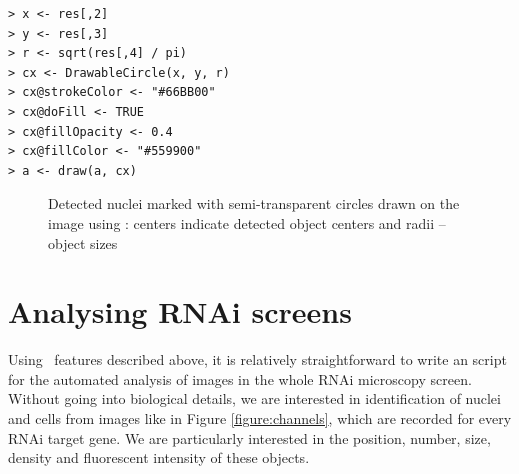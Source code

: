 \begin{verbatim}
> x <- res[,2]
> y <- res[,3]
> r <- sqrt(res[,4] / pi)
> cx <- DrawableCircle(x, y, r)
> cx@strokeColor <- "#66BB00"
> cx@doFill <- TRUE
> cx@fillOpacity <- 0.4
> cx@fillColor <- "#559900"
> a <- draw(a, cx)
\end{verbatim}

\begin{figure}
\vspace*{.1in}
\begin{center}
\end{center}
\caption{\label{figure:drawables}
    Detected nuclei marked with semi-transparent circles drawn on the image using : centers indicate detected object centers and radii -- object sizes
}
\end{figure}

\section*{Analysing RNAi screens}

Using \EBImage\ features described above, it is relatively straightforward to write an \R{} script for the automated analysis of images in the whole RNAi microscopy screen. Without going into biological details, we are interested in identification of nuclei and cells from images like in Figure \ref{figure:channels}, which are recorded for every RNAi target gene. We are particularly interested in the position, number, size, density and fluorescent intensity of these objects.

